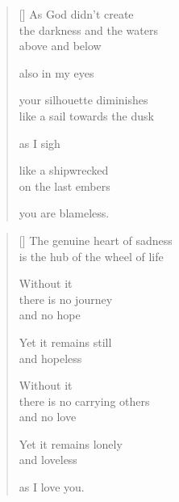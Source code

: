 \documentclass[14pt]{extbook}
\newcommand*{\centeredornament}{\centerline{\pgfornament[width=6cm]{88}}}
\begin{document}
\newpage

\vspace*{-15mm}
\centeredornament
\vspace*{-7mm}


\settowidth{\versewidth}{the darkness and the waters}

\begin{verse}[\versewidth]
  As God didn't create \\
  the darkness and the waters \\
  above and below

  also in my eyes

  your silhouette diminishes \\
  like a sail towards the dusk

  as I sigh

  like a shipwrecked \\
  on the last embers

  you are blameless.
\end{verse}


\newpage

\vspace*{-15mm}
\centeredornament
\vspace*{-7mm}


\settowidth{\versewidth}{is the hub of the wheel of life}

\begin{verse}[\versewidth]
  The genuine heart of sadness \\
  is the hub of the wheel of life

  Without it \\
  there is no journey \\
  and no hope

  Yet it remains still \\
  and hopeless

  Without it \\
  there is no carrying others \\
  and no love

  Yet it remains lonely \\
  and loveless

  as I love you.
\end{verse}

\end{document}
